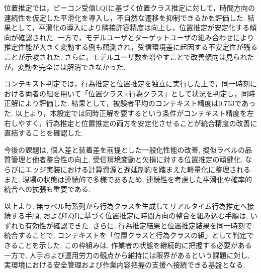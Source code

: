 \documentclass[a4paper,12pt]{jreport}
\begin{document}
位置推定では，ビーコン受信LQIに基づく位置クラス推定に対して，時間方向の連続性を仮定した平滑化を導入し，不自然な遷移を抑制できるかを評価した. 結果として，平滑化の導入により隣接許容精度は向上し，位置推定が安定化する傾向が確認された. 一方で，モデルユーザとターゲットユーザの組み合わせにより推定性能が大きく変動する例も観測され，受信環境差に起因する不安定性が残ることが示唆された. さらに，モデルユーザ数を増やすことで改善傾向は見られたが，変動を完全には解消できなかった. 

コンテキスト判定では，行為推定と位置推定を独立に実行した上で，同一時刻における両者の組を用いて「位置クラス×行為クラス」として状況を判定し，同時正解により評価した. 結果として，被験者平均のコンテキスト精度は0.753であった. 以上より，本設定では同時正解を要するという条件がコンテキスト精度を左右しやすく，行為推定と位置推定の両方を安定化させることが統合精度の改善に直結することを確認した. 

今後の課題は, 個人差と装着差を前提とした一般化性能の改善, 擬似ラベルの品質管理と他者整合性の向上, 受信環境変動と欠損に対する位置推定の頑健化, ならびにエッジ実装における計算資源と遅延制約を踏まえた軽量化に整理される. また, 現場の状態は連続的で多様であるため, 連続性を考慮した平滑化や確率的統合への拡張も重要である. 

以上より, 無ラベル時系列から行為クラスを生成してリアルタイム行為推定へ接続する手順, およびLQIに基づく位置推定に時間方向の整合を組み込む手順は, いずれも有効性が確認できた. さらに, 行為推定結果と位置推定結果を同一時刻で統合することで, コンテキストを「位置クラスと行為クラスの組」として判定できることを示した. この枠組みは, 作業者の状態を継続的に把握する必要がある一方で, 人手および運用労力の観点から維持には限界があるという課題に対し, 実環境における安全管理および作業内容把握の支援へ接続できる基盤となる. 
\end{document}
